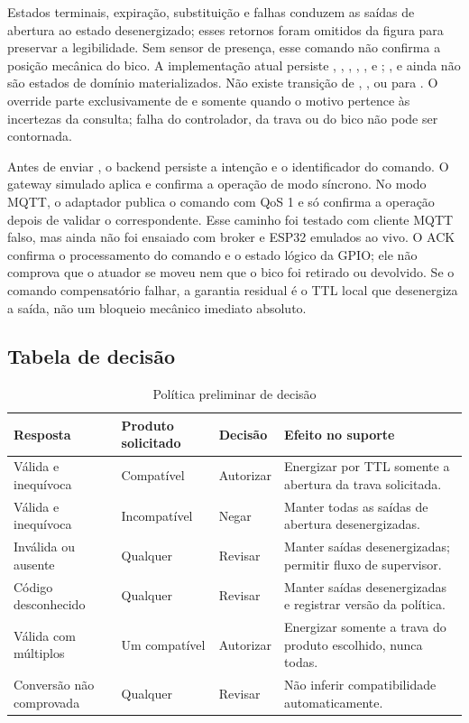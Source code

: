 Estados terminais, expiração, substituição e falhas conduzem as saídas de
abertura ao estado desenergizado; esses retornos foram omitidos da figura para
preservar a legibilidade. Sem sensor de presença, esse comando não confirma a
posição mecânica do bico. A implementação atual persiste ,
, , ,
,  e ;
,  e 
ainda não são estados de domínio materializados. Não existe transição de
, ,  ou
 para . O override parte exclusivamente de
 e somente quando o motivo pertence às incertezas da
consulta; falha do controlador, da trava ou do bico não pode ser contornada.

Antes de enviar , o backend persiste a intenção e o identificador
do comando. O gateway simulado aplica e confirma a operação de modo síncrono.
No modo MQTT, o adaptador publica o comando com QoS 1 e só confirma a operação
depois de validar o  correspondente. Esse caminho foi testado
com cliente MQTT falso, mas ainda não foi ensaiado com broker e ESP32 emulados
ao vivo. O ACK confirma o processamento do comando e o estado lógico da GPIO;
ele não comprova que o atuador se moveu nem que o bico foi retirado ou devolvido.
Se o comando compensatório falhar, a garantia residual é o TTL local que
desenergiza a saída, não um bloqueio mecânico imediato absoluto.

\subsection{Tabela de decisão}

\begin{table}[H]
  \centering
  \caption{Política preliminar de decisão}
  \label{tab:decisao}
  \small
  \begin{tabularx}{\textwidth}{@{}L{2.4cm}L{2.7cm}L{2.4cm}Y@{}}
    \toprule
    \textbf{Resposta} & \textbf{Produto solicitado} & \textbf{Decisão} & \textbf{Efeito no suporte} \\
    \midrule
    Válida e inequívoca & Compatível & Autorizar & Energizar por TTL somente a abertura da trava solicitada. \\
    Válida e inequívoca & Incompatível & Negar & Manter todas as saídas de abertura desenergizadas. \\
    Inválida ou ausente & Qualquer & Revisar & Manter saídas desenergizadas; permitir fluxo de supervisor. \\
    Código desconhecido & Qualquer & Revisar & Manter saídas desenergizadas e registrar versão da política. \\
    Válida com múltiplos & Um compatível & Autorizar & Energizar somente a trava do produto escolhido, nunca todas. \\
    Conversão não comprovada & Qualquer & Revisar & Não inferir compatibilidade automaticamente. \\
    \bottomrule
  \end{tabularx}
  \\[2pt]\fontepropria
\end{table}


